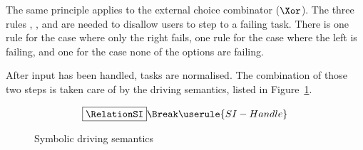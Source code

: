 The same principle applies to the external choice combinator ($\Xor$).
The three rules , , and 
are needed to disallow users to step to a failing task.
There is one rule for the case where only the right fails, one rule for the case where the left is failing, and one for the case none of the options are failing.

After input has been handled, tasks are normalised.
The combination of those two steps is taken care of by the driving semantics, listed in Figure~\ref{fig:driving}.

\begin{figure}[h]
  \small
  \begin{gather*}
    \boxed{\RelationSI} \Break
    \userule{SI-Handle}
  \end{gather*}
  \caption{Symbolic driving semantics}
  \label{fig:driving}
\end{figure}



